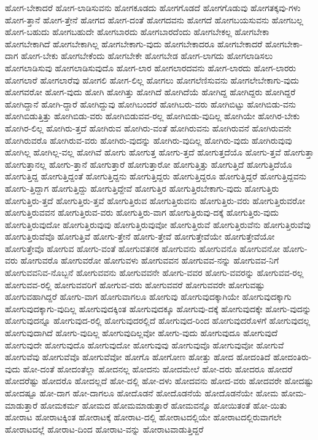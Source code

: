 {ಹೋಗ-ಬೇಕಾದರೆ
ಹೋಗ-ಲಾಡಿಸುವನು
ಹೋಗಕೂಡದು
ಹೋಗಗೊಡದೆ
ಹೋಗಗೊಡುವು
ಹೋಗತಕ್ಕವು-ಗಳು
ಹೋಗ-ತ್ತಾನೆ
ಹೋಗ-ತ್ತೇನೆ
ಹೋಗದ
ಹೋಗ-ದಂತೆ
ಹೋಗದವನು
ಹೋಗದೆ
ಹೋಗಬಯಸುವನು
ಹೋಗಬಲ್ಲ
ಹೋಗ-ಬಹುದು
ಹೋಗಬಹುದೇ
ಹೋಗಬಾರದು
ಹೋಗಬಾರದೆಂದು
ಹೋಗಬೇಕಲ್ಲ
ಹೋಗಬೇಕಾ
ಹೋಗಬೇಕಾಗಿದೆ
ಹೋಗಬೇಕಾಗಿಲ್ಲ
ಹೋಗಬೇಕಾಗು-ವುದು
ಹೋಗಬೇಕಾದರೂ
ಹೋಗಬೇಕಾದರೆ
ಹೋಗಬೇಕಾ-ದಾಗ
ಹೋಗ-ಬೇಕು
ಹೋಗಬೇಕೆಂದು
ಹೋಗಬೇಕೇ
ಹೋಗಬೇಡ
ಹೋಗ-ಲಾಗದು
ಹೋಗಲಾಡಿಸಲು
ಹೋಗಲಾಡಿಸುವು
ಹೋಗಲಾಡಿಸುವುದೊ
ಹೋಗ-ಲಾರ
ಹೋಗಲಾರದವನು
ಹೋಗ-ಲಾರದು
ಹೋಗ-ಲಾರರು
ಹೋಗಲಾರೆ
ಹೋಗಲಾರೆವು
ಹೋಗಲಿ
ಹೋಗ-ಲಿಲ್ಲ
ಹೋಗಲು
ಹೋಗಲೆಣಿಸುವನು
ಹೋಗಲೇಬೇಕಾಗು-ವುದು
ಹೋಗವರೋ
ಹೋಗ-ವುದು
ಹೋಗಿ
ಹೋಗಿತ್ತು
ಹೋಗಿದೆ
ಹೋಗಿದೆಯೆ
ಹೋಗಿದ್ದ
ಹೋಗಿದ್ದರು
ಹೋಗಿದ್ದರೆ
ಹೋಗಿದ್ದಾನೆ
ಹೋಗಿ-ದ್ದಾರೆ
ಹೋಗಿದ್ದುವು
ಹೋಗಿಬಂದರೆ
ಹೋಗಿಬರು-ವರು
ಹೋಗಿಬಿಟ್ಟು
ಹೋಗಿಬಿಡು-ವನು
ಹೋಗಿಬಿಡುತ್ತಿತ್ತು
ಹೋಗಿಬಿಡು-ವರು
ಹೋಗಿಬಿಡುವವ-ರಲ್ಲ
ಹೋಗಿಬಿಡು-ವುದಿಲ್ಲ
ಹೋಗಿಯೇ
ಹೋಗಿರ-ಬೇಕು
ಹೋಗಿರ-ಲಿಲ್ಲ
ಹೋಗಿರು-ತ್ತದೆ
ಹೋಗಿರುವ
ಹೋಗಿರು-ವಂತೆ
ಹೋಗಿರುವನು
ಹೋಗಿರುವನೆ
ಹೋಗಿರುವನೇ
ಹೋಗಿರುವರೊ
ಹೋಗಿರುವ-ವರು
ಹೋಗಿರು-ವುದನ್ನು
ಹೋಗಿರು-ವುದಿಲ್ಲ
ಹೋಗಿರು-ವುದು
ಹೋಗಿರುವುವು
ಹೋಗಿಲ್ಲ
ಹೋಗಿಲ್ಲ-ವಲ್ಲ
ಹೋಗಿವೆ
ಹೋಗು
ಹೋಗುತ್ತ
ಹೋಗು-ತ್ತದೆ
ಹೋಗುತ್ತದೆಯೊ
ಹೋಗು-ತ್ತವೆ
ಹೋಗುತ್ತಾ
ಹೋಗುತ್ತಾನಲ್ಲ
ಹೋಗು-ತ್ತಾನೆ
ಹೋಗುತ್ತಾರೆ
ಹೋಗುತ್ತಾರೋ
ಹೋಗುತ್ತಿತ್ತು
ಹೋಗುತ್ತಿದೆ
ಹೋಗುತ್ತಿದೆಯೊ
ಹೋಗುತ್ತಿದ್ದ
ಹೋಗುತ್ತಿದ್ದಂತೆ
ಹೋಗುತ್ತಿದ್ದನು
ಹೋಗುತ್ತಿದ್ದರು
ಹೋಗುತ್ತಿದ್ದರೂ
ಹೋಗುತ್ತಿದ್ದರೆ
ಹೋಗುತ್ತಿದ್ದವನು
ಹೋಗು-ತ್ತಿದ್ದಾಗ
ಹೋಗುತ್ತಿದ್ದು
ಹೋಗುತ್ತಿದ್ದೇವೆ
ಹೋಗುತ್ತಿರ
ಹೋಗುತ್ತಿರಬೇಕಾಗು-ವುದು
ಹೋಗುತ್ತಿರು
ಹೋಗುತ್ತಿರು-ತ್ತದೆ
ಹೋಗುತ್ತಿರು-ತ್ತವೆ
ಹೋಗುತ್ತಿರುವ
ಹೋಗುತ್ತಿರುವನು
ಹೋಗುತ್ತಿರು-ವರು
ಹೋಗುತ್ತಿರುವರೋ
ಹೋಗುತ್ತಿರುವವನ
ಹೋಗುತ್ತಿರುವ-ವರು
ಹೋಗುತ್ತಿರು-ವಾಗ
ಹೋಗುತ್ತಿರುವು-ದಕ್ಕೆ
ಹೋಗುತ್ತಿರು-ವುದು
ಹೋಗುತ್ತಿರುವುದೋ
ಹೋಗುತ್ತಿರುವುವು
ಹೋಗುತ್ತಿರುವುವೋ
ಹೋಗುತ್ತಿರುವೆ
ಹೋಗುತ್ತಿರುವೆನು
ಹೋಗುತ್ತಿರುವೆವು
ಹೋಗುತ್ತಿರುವೆವೊ
ಹೋಗುತ್ತಿವೆ
ಹೋಗು-ತ್ತೇನೆ
ಹೋಗು-ತ್ತೇವೆ
ಹೋಗುತ್ತೇವೆಯೇ
ಹೋಗುತ್ತೇವೆಯೋ
ಹೋಗುತ್ತೇವೊ
ಹೋಗುವ
ಹೋಗು-ವಂತೆ
ಹೋಗುವತನಕ
ಹೋಗುವನು
ಹೋಗುವನೊ
ಹೋಗುವನೋ
ಹೋಗು-ವರು
ಹೋಗುವರೊ
ಹೋಗುವರೋ
ಹೋಗುವಳು
ಹೋಗುವವನ
ಹೋಗುವವ-ನನ್ನು
ಹೋಗುವವ-ನಿಗೆ
ಹೋಗುವವನಿವ-ನೊಬ್ಬನೆ
ಹೋಗುವವನು
ಹೋಗುವವನೇ
ಹೋಗು-ವವರ
ಹೋಗು-ವವರನ್ನು
ಹೋಗುವವ-ರಲ್ಲ
ಹೋಗುವವ-ರಲ್ಲಿ
ಹೋಗುವವರಿಗೆ
ಹೋಗುವ-ವರು
ಹೋಗುವವರೆ
ಹೋಗುವವರೇ
ಹೋಗುವಷ್ಟು
ಹೋಗುವಹಾಗಿದ್ದರೆ
ಹೋಗು-ವಾಗ
ಹೋಗುವಾಗಲೂ
ಹೋಗುವು
ಹೋಗುವುದಕ್ಕಾಗಿಯೇ
ಹೋಗುವುದಕ್ಕಾಗು
ಹೋಗುವುದಕ್ಕಾಗು-ವುದಿಲ್ಲ
ಹೋಗುವುದಕ್ಕಿಂತ
ಹೋಗುವುದಕ್ಕೂ
ಹೋಗುವು-ದಕ್ಕೆ
ಹೋಗುವುದಕ್ಕೇ
ಹೋಗು-ವುದನ್ನು
ಹೋಗುವುದನ್ನೂ
ಹೋಗುವುದ-ರಲ್ಲಿ
ಹೋಗುವುದರಲ್ಲಿದೆ
ಹೋಗುವುದ-ರಿಂದ
ಹೋಗುವುದರೊಳಗೆ
ಹೋಗುವುದಲ್ಲ
ಹೋಗುವುದಾಗಿದೆ
ಹೋಗು-ವುದಿಲ್ಲ
ಹೋಗುವುದಿಲ್ಲವೋ
ಹೋಗು-ವುದು
ಹೋಗುವುದೂ
ಹೋಗುವುದೆ
ಹೋಗುವುದೇ
ಹೋಗುವುದೊ
ಹೋಗುವುದೋ
ಹೋಗುವುವು
ಹೋಗುವುವೊ
ಹೋಗುವುವೋ
ಹೋಗುವೆ
ಹೋಗುವೆವು
ಹೋಗುವೆವೊ
ಹೋಗುವೆವೋ
ಹೋಗೊ
ಹೋಗೋಣ
ಹೋತ್ತು
ಹೋದ
ಹೋದಂತಿದೆ
ಹೋದಂತಿರು-ವುದು
ಹೋ-ದಂತೆ
ಹೋದಂತೆಲ್ಲಾ
ಹೋದನಲ್ಲ
ಹೋದನು
ಹೋದಮೇಲೆ
ಹೋ-ದರು
ಹೋದರೂ
ಹೋದರೆ
ಹೋದರೆಷ್ಟು
ಹೋದರೊ
ಹೋದಲ್ಲದೆ
ಹೋ-ದಲ್ಲಿ
ಹೋ-ದಳು
ಹೋದವನು
ಹೋದ-ವರು
ಹೋದವರೇ
ಹೋದಷ್ಟು
ಹೋದಷ್ಟೂ
ಹೋ-ದಾಗ
ಹೋ-ದಾಗಲೂ
ಹೋದೊಡನೆ
ಹೋದೊಡನೆಯೆ
ಹೋದೊಡನೆಯೇ
ಹೋಮ
ಹೋಮ-ಮಾಡುತ್ತಾರೆ
ಹೋಮಕರ್ಮ
ಹೋಮದ
ಹೋಮಮಾಡುತ್ತಾರೆ
ಹೋಮವನ್ನೊ
ಹೋಯಿತಂತೆ
ಹೋ-ಯಿತು
ಹೋರಾಟ
ಹೋರಾಟಕ್ಕಿಂತ
ಹೋರಾಟಕ್ಕೆ
ಹೋರಾಟ-ದಲ್ಲಿ
ಹೋರಾಟದಲ್ಲಿಯೇ
ಹೋರಾಟದಲ್ಲಿರುವಾಗಲೇ
ಹೋರಾಟದಲ್ಲೆ
ಹೋರಾಟ-ದಿಂದ
ಹೋರಾಟ-ವನ್ನು
ಹೋರಾಟವಾಡುತ್ತಿದ್ದರೆ
}
